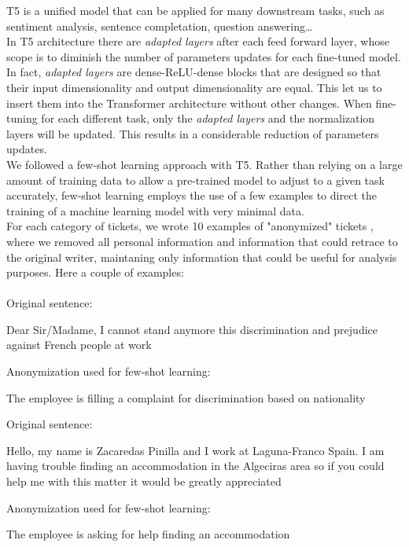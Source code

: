 T5 is a unified model that can be applied for many downstream tasks, such as sentiment analysis, sentence completation, question answering\dots\\
In T5 architecture there are \textit{adapted layers} after each feed forward layer, whose scope is to diminish the number of parameters updates for each fine-tuned model. In fact, \textit{adapted layers} are dense-ReLU-dense blocks that are designed so that their input dimensionality and output dimensionality are equal. This let us to insert them into the Transformer architecture without other changes. When fine-tuning for each different task, only the \textit{adapted layers} and the normalization layers will be updated. This results in a considerable reduction of parameters updates.\\
We followed a few-shot learning approach with T5. Rather than relying on a large amount of training data to allow a pre-trained model to adjust to a given task accurately, few-shot learning employs the use of a few examples to direct the training of a machine learning model with very minimal data. \\
For each category of tickets, we wrote 10 examples of "anonymized" tickets , where we removed all personal information and information that could retrace to the original writer, maintaning only information that could be useful for analysis purposes.
Here a couple of examples:\\ \\
Original sentence:
\begin{adjustwidth}{1cm}{}
    Dear Sir/Madame, I cannot stand anymore this discrimination and prejudice against French people at work
\end{adjustwidth}
Anonymization used for few-shot learning:
\begin{adjustwidth}{1cm}{}
    The employee is filling a complaint for discrimination based on nationality 
\end{adjustwidth}
Original sentence:
\begin{adjustwidth}{1cm}{}
    Hello, my name is Zacaredas Pinilla and I work at Laguna-Franco Spain. I am having trouble finding an accommodation in the Algeciras area so if you could help me with this matter it would be greatly appreciated
\end{adjustwidth}
Anonymization used for few-shot learning:
\begin{adjustwidth}{1cm}{}
    The employee is asking for help finding an accommodation
\end{adjustwidth}



